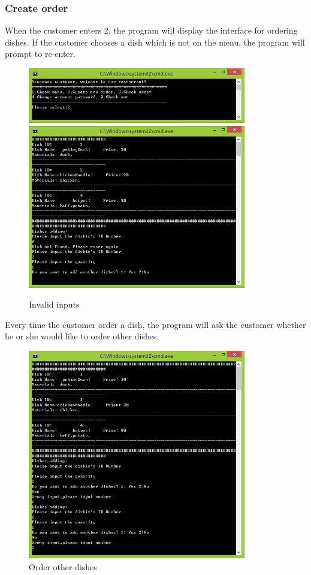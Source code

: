 \documentclass{article}
\begin{document}
\subsubsection{Create order}
When the customer enters 2, the program will display the interface for ordering dishes. If the customer chooses a dish which is not on the menu, the program will prompt to re-enter.
\begin{figure}[H]
    \centering
    \includegraphics[width=0.85\textwidth]{P/P2a.jpg}
    \includegraphics[width=0.85\textwidth]{P/P2b.jpg}
    \caption{Invalid inputs}
\end{figure}
\noindent
Every time the customer order a dish, the program will ask the customer whether he or she would like to order other dishes.
\begin{figure}[H]
    \centering
    \includegraphics[width=0.85\textwidth]{P/P2c.jpg}
    \caption{Order other dishes}
\end{figure}
\end{document}
